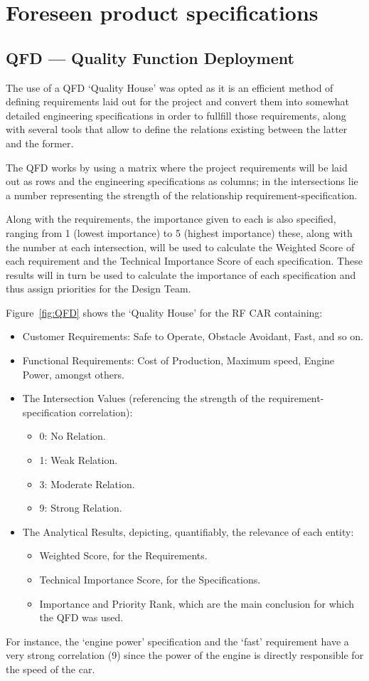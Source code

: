 \section{Foreseen product specifications}%
\label{sec:org31f7574}
\subsection{QFD --- Quality Function Deployment}%
\label{sec:qfd}
The use of a QFD `Quality House' was opted as it is an efficient method of defining requirements laid out for the project and convert them into somewhat detailed engineering specifications in order to fullfill those requirements, along with several tools that allow to define the relations existing between the latter and the former.

The QFD works by using a matrix where the project requirements will be laid out as rows and the engineering specifications as columns; in the intersections lie a number representing the strength of the relationship requirement-specification.

Along with the requirements, the importance given to each is also specified, ranging from 1 (lowest importance) to 5 (highest importance) these, along with the number at each intersection, will be used to calculate the Weighted Score of each requirement and the Technical Importance Score of each specification. These results will in turn be used to calculate the importance of each specification and thus assign priorities for the Design Team.

Figure~\ref{fig:QFD} shows the `Quality House' for the RF CAR containing:
\begin{itemize}
\item Customer Requirements: Safe to Operate, Obstacle Avoidant, Fast, and so
  on.
\item Functional Requirements: Cost of Production, Maximum speed, Engine
  Power, amongst others.
\item The Intersection Values (referencing the strength of the
  requirement-specification correlation):
  \begin{itemize}
  \item 0: No Relation.
  \item 1: Weak Relation.
  \item 3: Moderate Relation.
  \item 9: Strong Relation.
  \end{itemize}
\item The Analytical Results, depicting, quantifiably, the relevance of each
  entity:
  \begin{itemize}
  \item Weighted Score, for the Requirements.
  \item Technical Importance Score, for the Specifications.
  \item Importance and Priority Rank, which are the main conclusion for which
    the QFD was used.
  \end{itemize}
\end{itemize}
For instance, the `engine power' specification and the `fast' requirement have a
very strong correlation (9) since the power of the engine is directly
responsible for the speed of the car.

